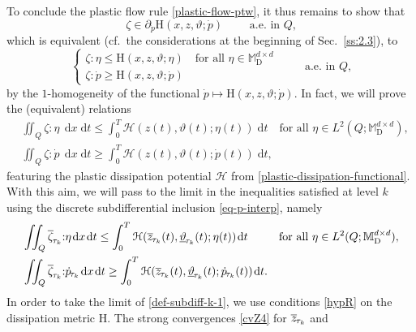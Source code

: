 \documentclass[a4paper,10pt,reqno]{amsart}
\numberwithin{equation}{section}
\newcommand{\bbM}{\mathbb{M}}
\numberwithin{equation}{section}
\def\dd{\;\!\mathrm{d}} %
\newcommand{\teta}{\vartheta}
\newcommand{\piecewiseConstant}[2]{\overline{#1}_{\kern-1pt#2}}
\newcommand{\pwc}{\piecewiseConstant}
\newcommand{\upiecewiseConstant}[2]{\underline{#1}_{\kern-1pt#2}}
\newcommand{\upwc}{\upiecewiseConstant}
\newcommand{\piecewiseLinear}[2]{{#1}_{\kern-1pt#2}}
\newcommand{\pwl}{\piecewiseLinear}
\newcommand{\mt}{\bbM}
\newcommand{\dev}{\mathrm{D}}
\newcommand{\Dipname}{\mathcal{H}}
\newcommand{\dipx}[4]{\mathrm{H}(#1,#2, #3;#4)}
\newcommand{\Dip}[3]{\mathcal{H}(#1,#2;#3)}
\begin{document}
To conclude  the plastic flow rule \eqref{plastic-flow-ptw}, it thus  remains to show that 
\begin{equation}
\label{identification-zeta}
\zeta \in \partial_{\dot p} \dipx{x}{z}{\teta}{ \dot p} \qquad \text{ a.e.\ in $Q$,}
\end{equation}
which is equivalent (cf.\ the considerations at the beginning of Sec.\ \ref{ss:2.3}),  to
\[
\begin{cases}
 \zeta : \eta \leq  \dipx{x}{z}{\teta}{ \eta}  \quad \text{for all } \eta \in \mt_\dev^{d\times d}
\\
 \zeta : \dot{p}  \geq \dipx{x}{z}{\teta}{ \dot p}
\end{cases}
 \qquad \text{ a.e.\ in $Q$,}
\]
by the  
$1$-homogeneity of the functional $\dot{p} \mapsto \dipx{x}{z}{\teta}{ \dot p}$. In fact, we will prove the (equivalent) relations
\begin{subequations}
\label{def-subdiff}
\begin{align}
& 
\label{def-subdiff-a}
\iint_Q \zeta{:} \eta\, \dd x \dd t \leq \int_0^T \Dip{z(t)}{\teta(t)}{ \eta(t)} \dd t \quad \text{for all } \eta \in L^2(Q;\mt_{\dev}^{d\times d}), 
\\
& 
\label{def-subdiff-b}
   \iint_Q \zeta{:} \dot{p} \,\dd x \dd t  \geq \int_0^T \Dip{z(t)}{\teta(t)}{ \dot{p}(t)} \dd t,
   \end{align}
\end{subequations}
featuring the plastic dissipation potential $\Dipname$ from \eqref{plastic-dissipation-functional}. 
With this aim, we will 
pass to the limit  
in the inequalities  satisfied at level $k$ using  the discrete subdifferential inclusion \eqref{eq-p-interp}, namely
\begin{subequations}
\label{def-subdiff-k}
\begin{align}
\label{def-subdiff-k-1}
&
\iint_Q  \pwc\zeta{\tau_k} {:} \eta \dd x \dd t \leq \int_0^T   \Dip{\pwc z{\tau_k}(t)}{\upwc\teta{\tau_k}(t)}{  \eta(t)} \dd t && \text{for all } \eta \in L^2(Q;\mt_{\dev}^{d\times d}), \\  
\label{def-subdiff-k-2}
&
\iint_Q  \pwc\zeta{\tau_k}  {:}  \pwl { \dot p}{\tau_k}  \dd x \dd t  \geq \int_0^T   \Dip{\pwc z{\tau_k}(t)}{\upwc\teta{\tau_k}(t)}{  \pwl {\dot{p}}{\tau_k}(t)} \dd t.  &&
\end{align}
\end{subequations}
In order to take the limit of \eqref{def-subdiff-k-1},
we use conditions \eqref{hypR} on the dissipation metric $\mathrm{H}$.    The strong convergences
\eqref{cvZ4} for $\pwc z{\tau_k}$  and 
\end{document}
